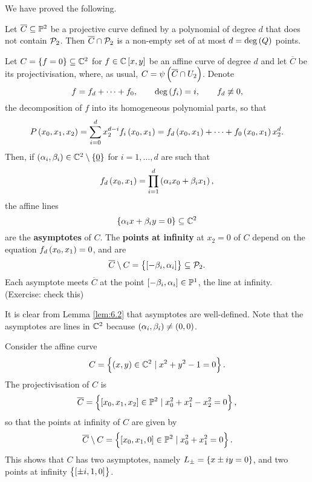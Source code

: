 We have proved the following.

\begin{theorem}
Let $ \overline{C} \subseteq \P^2 $ be a projective curve defined by a polynomial of degree $ d $ that does not contain $ \PP_2 $. Then $ \overline{C} \cap \PP_2 $ is a non-empty set of at most $ d = \deg\br{Q} $ points.
\end{theorem}

\begin{definition}
Let $ C = \cbr{f = 0} \subseteq \C^2 $ for $ f \in \C\sbr{x, y} $ be an affine curve of degree $ d $ and let $ \overline{C} $ be its projectivisation, where, as usual, $ C = \psi\br{\overline{C} \cap U_2} $. Denote
$$ f = f_d + \dots + f_0, \qquad \deg\br{f_i} = i, \qquad f_d \not\equiv 0, $$
the decomposition of $ f $ into its homogeneous polynomial parts, so that
$$ P\br{x_0, x_1, x_2} = \sum_{i = 0}^d x_2^{d - i}f_i\br{x_0, x_1} = f_d\br{x_0, x_1} + \dots + f_0\br{x_0, x_1}x_2^d. $$
Then, if $ \br{\alpha_i, \beta_i} \in \C^2 \setminus \cbr{\underline{0}} $ for $ i = 1, \dots, d $ are such that
$$ f_d\br{x_0, x_1} = \prod_{i = 1}^d \br{\alpha_ix_0 + \beta_ix_1}, $$
the affine lines
$$ \cbr{\alpha_ix + \beta_iy = 0} \subseteq \C^2 $$
are the \textbf{asymptotes} of $ C $. The \textbf{points at infinity} at $ x_2 = 0 $ of $ C $ depend on the equation $ f_d\br{x_0, x_1} = 0 $, and are
$$ \overline{C} \setminus C = \cbr{\sbr{-\beta_i, \alpha_i}} \subseteq \PP_2. $$
Each asymptote meets $ \overline{C} $ at the point $ \sbr{-\beta_i, \alpha_i} \in \P^1 $, the line at infinity. (Exercise: check this)
\end{definition}

\begin{remark}
It is clear from Lemma \ref{lem:6.2} that asymptotes are well-defined. Note that the asymptotes are lines in $ \C^2 $ because $ \br{\alpha_i, \beta_i} \ne \br{0, 0} $.
\end{remark}

\begin{example}
Consider the affine curve
$$ C = \cbr{\br{x, y} \in \C^2 \mid x^2 + y^2 - 1 = 0}. $$
The projectivisation of $ C $ is
$$ \overline{C} = \cbr{\sbr{x_0, x_1, x_2} \in \P^2 \mid x_0^2 + x_1^2 - x_2^2 = 0}, $$
so that the points at infinity of $ C $ are given by
$$ \overline{C} \setminus C = \cbr{\sbr{x_0, x_1, 0} \in \P^2 \mid x_0^2 + x_1^2 = 0}. $$
This shows that $ C $ has two asymptotes, namely $ L_\pm = \cbr{x \pm iy = 0} $, and two points at infinity $ \cbr{\sbr{\pm i, 1, 0}} $.
\end{example}

